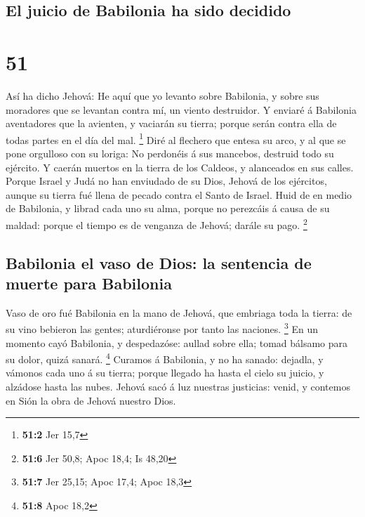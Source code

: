 \hypertarget{el-juicio-de-babilonia-ha-sido-decidido}{%
\subsection{El juicio de Babilonia ha sido
decidido}\label{el-juicio-de-babilonia-ha-sido-decidido}}

\hypertarget{section-50}{%
\section{51}\label{section-50}}

 Así ha dicho Jehová: He aquí que yo levanto sobre
Babilonia, y sobre sus moradores que se levantan contra mí, un viento
destruidor.  Y enviaré á Babilonia aventadores que la
avienten, y vaciarán su tierra; porque serán contra ella de todas partes
en el día del mal. \footnote{\textbf{51:2} Jer 15,7}  Diré
al flechero que entesa su arco, y al que se pone orgulloso con su
loriga: No perdonéis á sus mancebos, destruid todo su ejército.
 Y caerán muertos en la tierra de los Caldeos, y
alanceados en sus calles.  Porque Israel y Judá no han
enviudado de su Dios, Jehová de los ejércitos, aunque su tierra fué
llena de pecado contra el Santo de Israel.  Huid de en
medio de Babilonia, y librad cada uno su alma, porque no perezcáis á
causa de su maldad: porque el tiempo es de venganza de Jehová; darále su
pago. \footnote{\textbf{51:6} Jer 50,8; Apoc 18,4; Is 48,20}

\hypertarget{babilonia-el-vaso-de-dios-la-sentencia-de-muerte-para-babilonia}{%
\subsection{Babilonia el vaso de Dios: la sentencia de muerte para
Babilonia}\label{babilonia-el-vaso-de-dios-la-sentencia-de-muerte-para-babilonia}}

 Vaso de oro fué Babilonia en la mano de Jehová, que
embriaga toda la tierra: de su vino bebieron las gentes; aturdiéronse
por tanto las naciones. \footnote{\textbf{51:7} Jer 25,15; Apoc 17,4;
  Apoc 18,3}  En un momento cayó Babilonia, y despedazóse:
aullad sobre ella; tomad bálsamo para su dolor, quizá sanará.
\footnote{\textbf{51:8} Apoc 18,2}  Curamos á Babilonia, y
no ha sanado: dejadla, y vámonos cada uno á su tierra; porque llegado ha
hasta el cielo su juicio, y alzádose hasta las nubes. 
Jehová sacó á luz nuestras justicias: venid, y contemos en Sión la obra
de Jehová nuestro Dios.

